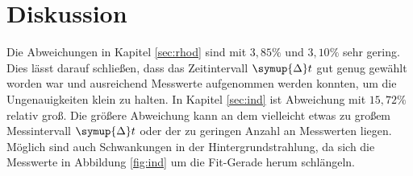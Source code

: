\section{Diskussion}

Die Abweichungen in Kapitel \ref{sec:rhod} sind mit $3,85 \%$ und $3,10 \%$ sehr gering. Dies lässt darauf schließen, dass das Zeitintervall
$\symup{\Delta}t$ gut genug gewählt worden war und ausreichend Messwerte aufgenommen werden konnten, um die Ungenauigkeiten klein zu halten.
In Kapitel \ref{sec:ind} ist Abweichung mit $15,72 \%$ relativ groß.
Die größere Abweichung kann an dem vielleicht etwas zu großem Messintervall $\symup{\Delta}t$ oder der zu geringen Anzahl an Messwerten liegen.
Möglich sind auch Schwankungen in der Hintergrundstrahlung, da sich die Messwerte in Abbildung \ref{fig:ind} um die Fit-Gerade herum schlängeln.
